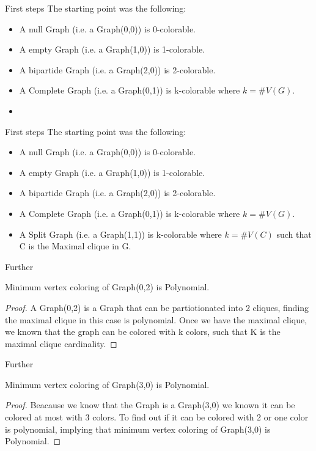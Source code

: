\documentclass[9pt, compress]{beamer}
\begin{document}
    \begin{frame}{First steps}
      The starting point was the following:
      \begin{itemize}
        \item A null Graph (i.e. a Graph(0,0)) is 0-colorable.
        \item A empty Graph (i.e. a Graph(1,0)) is 1-colorable.
        \item A bipartide Graph (i.e. a Graph(2,0)) is 2-colorable.
        \item A Complete Graph (i.e. a Graph(0,1)) is k-colorable where $k = \#V(G)$.
        \item                                                                                                               
      \end{itemize}
    \end{frame}
    \begin{frame}{First steps}
      The starting point was the following:
      \begin{itemize}
        \item A null Graph (i.e. a Graph(0,0)) is 0-colorable.
        \item A empty Graph (i.e. a Graph(1,0)) is 1-colorable.
        \item A bipartide Graph (i.e. a Graph(2,0)) is 2-colorable.
        \item A Complete Graph (i.e. a Graph(0,1)) is k-colorable where $k = \#V(G)$.
        \item A Split Graph (i.e. a Graph(1,1)) is k-colorable where $k = \#V(C)$ such that C is the Maximal clique in G.
      \end{itemize}
    \end{frame}
    \begin{frame}{Further}
      \begin{theorem}
        Minimum vertex coloring of Graph(0,2) is Polynomial.
     \end{theorem}
     \begin{proof}
      A Graph(0,2) is a Graph that can be partiotionated into 2 cliques, finding the maximal clique in this case is polynomial. 
      Once we have the maximal clique, we known that the graph can be colored with k colors, such that K is the maximal clique cardinality.
     \end{proof}
    \end{frame}
    \begin{frame}{Further}
      \begin{theorem}
        Minimum vertex coloring of Graph(3,0) is Polynomial.
     \end{theorem}
     \begin{proof}
      Beacause we know that the Graph is a Graph(3,0) we known it can be colored at most with 3 colors.
      To find out if it can be colored with 2 or one color is polynomial, implying that minimum vertex coloring of Graph(3,0) is Polynomial.
     \end{proof}
    \end{frame}
\end{document}
